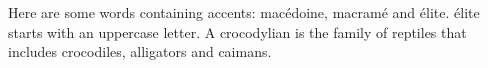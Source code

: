 \documentclass[12pt]{article}
\begin{document}
Here are some words containing accents: \gls{macédoine},
\gls{macramé} and \gls{élite}. \Gls{élite} starts with an uppercase
letter. A \gls{crocodylian} is the family of 
\glspl{reptile} that includes \glspl{crocodile}, \glspl{alligator}
and \glspl{caiman}. 

\printterms
[
 heading={\section*},
 database=index,
 prelocation=dotfill,
 showgroups
] 
\end{document}
